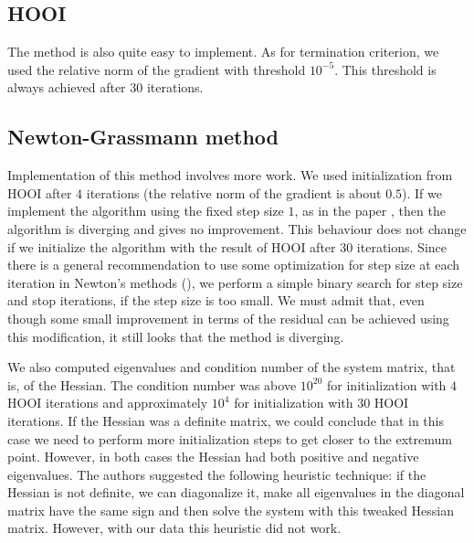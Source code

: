 \subsection{HOOI}

The method is also quite easy to implement. As for termination criterion,
we used the relative norm of the gradient with threshold $10^{-5}$. This threshold
is always achieved after $30$ iterations.



\subsection{Newton-Grassmann method}

Implementation of this method involves more work. We used initialization from HOOI after $4$ iterations (the relative
norm of the gradient is about $0.5$). If we implement the algorithm
using the fixed step size $1$, as in the paper \cite{elden_savas_2009},
then the algorithm is diverging and gives no improvement. This behaviour
does not change if we initialize the algorithm with the result of HOOI
after $30$ iterations. 
Since there is a general recommendation to use some optimization
for step size at each iteration in Newton's methods (\cite{num_recipes}),
we perform a simple binary search for step size
and stop iterations, if the step size is too small.
We must admit that, even though some small improvement
in terms of the residual can be achieved using this modification,
it still looks that the method is diverging.


We also computed eigenvalues and condition number of the system matrix,
that is, of the Hessian. The condition number was above $10^{20}$ for initialization
with $4$ HOOI iterations and approximately $10^4$ for initialization with $30$
HOOI iterations. If the Hessian was a definite matrix,
we could conclude that in this case we need to perform more
initialization steps to get closer to the extremum point.
However, in both cases the Hessian had both positive and negative
eigenvalues. The authors suggested the following heuristic technique: if the Hessian is not definite, we can diagonalize it, make all
eigenvalues in the diagonal matrix have the same sign and then solve the system with this tweaked Hessian matrix. However,
with our data this heuristic did not work.

